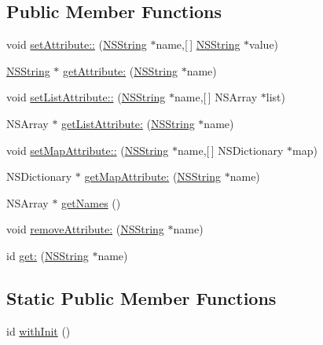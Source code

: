 \subsection*{\-Public \-Member \-Functions}
\begin{DoxyCompactItemize}
\item 
void \hyperlink{interface_location_response_aae4db6f7a8388d784b29f94183085924}{set\-Attribute\-::} (\hyperlink{class_n_s_string}{\-N\-S\-String} $\ast$name,\mbox{[}$\,$\mbox{]} \hyperlink{class_n_s_string}{\-N\-S\-String} $\ast$value)
\item 
\hyperlink{class_n_s_string}{\-N\-S\-String} $\ast$ \hyperlink{interface_location_response_a98189294fe127b441493a44deb7ae180}{get\-Attribute\-:} (\hyperlink{class_n_s_string}{\-N\-S\-String} $\ast$name)
\item 
void \hyperlink{interface_location_response_a41a521860c8ced0699964af8dab98d4c}{set\-List\-Attribute\-::} (\hyperlink{class_n_s_string}{\-N\-S\-String} $\ast$name,\mbox{[}$\,$\mbox{]} \-N\-S\-Array $\ast$list)
\item 
\-N\-S\-Array $\ast$ \hyperlink{interface_location_response_a27fba83b06df99c402f7b442782c2a2a}{get\-List\-Attribute\-:} (\hyperlink{class_n_s_string}{\-N\-S\-String} $\ast$name)
\item 
void \hyperlink{interface_location_response_a79265910e97c3f428df2e0fa91dfa702}{set\-Map\-Attribute\-::} (\hyperlink{class_n_s_string}{\-N\-S\-String} $\ast$name,\mbox{[}$\,$\mbox{]} \-N\-S\-Dictionary $\ast$map)
\item 
\-N\-S\-Dictionary $\ast$ \hyperlink{interface_location_response_acd0fa9d05aad8ac28d3317c10484239a}{get\-Map\-Attribute\-:} (\hyperlink{class_n_s_string}{\-N\-S\-String} $\ast$name)
\item 
\-N\-S\-Array $\ast$ \hyperlink{interface_location_response_adb571107d73aa55ae27c16d217b49261}{get\-Names} ()
\item 
void \hyperlink{interface_location_response_a2523a8a5bf0d30f6aeeced53383dfff5}{remove\-Attribute\-:} (\hyperlink{class_n_s_string}{\-N\-S\-String} $\ast$name)
\item 
id \hyperlink{interface_location_response_a1ae29d71506b1e80c585b31a104b726e}{get\-:} (\hyperlink{class_n_s_string}{\-N\-S\-String} $\ast$name)
\end{DoxyCompactItemize}
\subsection*{\-Static \-Public \-Member \-Functions}
\begin{DoxyCompactItemize}
\item 
id \hyperlink{interface_location_response_a026364594f3d5b9ea1ca06a688a16c7d}{with\-Init} ()
\end{DoxyCompactItemize}


